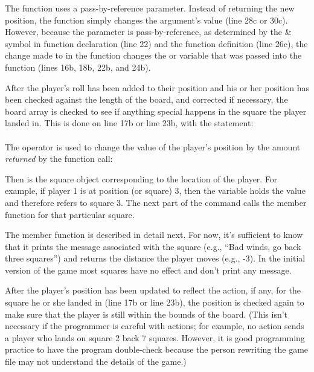 The function uses a pass-by-reference parameter.  Instead of returning the new position, the function simply changes the argument's value (line 28c or 30c).  However, because the parameter  is pass-by-reference, as determined by the \& symbol in function declaration (line 22) and the function definition (line 26c), the change made to  in the function changes the  or  variable that was passed into the function (lines 16b, 18b, 22b, and 24b).

After the player's roll has been added to their position and his or her position has been checked against the length of the board, and corrected if necessary, the board array is checked to see if anything special happens in the square the player landed in.  This is done on line 17b or line 23b, with the statement:\\
\\
The \cf{+=} operator is used to change the value of the player's position by the amount \emph{returned} by the function call: 

Then  is the square object corresponding to the location of the player.  For example, if player 1 is at position (or square) 3, then the variable  holds the value  and therefore  refers to square 3.  The next part of the command  calls the member function  for that particular square.  

The  member function is described in detail next.  For now, it's sufficient to know that it prints the message associated with the square (e.g., ``Bad winds, go back three squares'') and returns the distance the player moves (e.g., -3).  In the initial version of the game most squares have no effect and don't print any message.  

After the player's position has been updated to reflect the action, if any, for the square he or she landed in (line 17b or line 23b), the position is checked again to make sure that the player is still within the bounds of the board.  (This isn't necessary if the programmer is careful with actions; for example, no action sends a player who lands on square 2 back 7 squares.  However, it is good programming practice to have the program double-check because the person rewriting the game file may not understand the details of the game.)  

